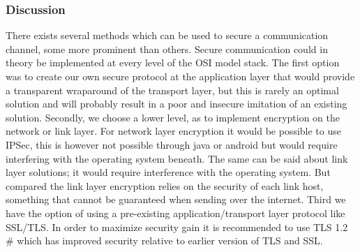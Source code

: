 \subsubsection{Discussion}
There exists several methods which can be used to secure a communication channel, some more prominent than others. Secure communication could in theory be implemented at every level of the OSI model stack. The first option was to create our own secure protocol at the application layer that would provide a transparent wraparound of the transport layer, but this is rarely an optimal solution and will probably result in a poor and insecure imitation of an existing solution.
\newline
\newline
Secondly, we choose a lower level, as to implement encryption on the network or link layer. For network layer encryption it would be possible to use IPSec, this is however not possible through java or android but would require interfering with the operating system beneath.  The same can be said about link layer solutions; it would require interference with the operating system. But compared the link layer encryption relies on the security of each link host, something that cannot be guaranteed when sending over the internet.
\newline
\newline
Third we have the option of using a pre-existing application/transport layer protocol like SSL/TLS. In order to maximize security gain it is recommended to use TLS 1.2 \# which has improved security relative to earlier version of TLS and SSL.